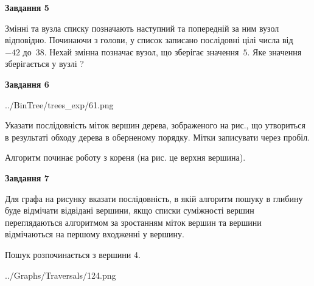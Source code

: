 \documentclass[12pt, ukrainian]{article}
\begin{document}
{\begin {large}
{\begin {center}\textbf{Завдання 5}\end {center}}\par
Змінні  та  вузла списку позначають наступний та попередній за ним вузол відповідно. Починаючи з голови, у список записано послідовні цілі числа від~$-42$ до~$38$. Нехай змінна  позначає вузол, що зберігає значення~$5$.
Яке значення зберігається у вузлі  ?\par
\newpage

{\begin {center}\textbf{Завдання 6}\end {center}}\par

\begin{center}
	{../BinTree/trees_exp/61.png}
\end{center}
Указати послідовність міток вершин дерева, зображеного на рис., що утвориться в результаті обходу дерева в оберненому порядку. Мітки записувати через пробіл.\par Алгоритм починає роботу з кореня (на рис. це верхня вершина).\par
\newpage

{\begin {center}\textbf{Завдання 7}\end {center}}\par
Для графа на рисунку вказати послідовність, в якій алгоритм пошуку в глибину буде відмічати відвідані вершини, якщо списки суміжності вершин переглядаються алгоритмом за зростанням міток вершин та вершини відмічаються на першому вход\-женні у вершину.\par
Пошук розпочинається з вершини 4.\par

\begin{center}
	{../Graphs/Traversals/124.png}
\end{center}\par
\newpage


\end{large}}
\end{document}
